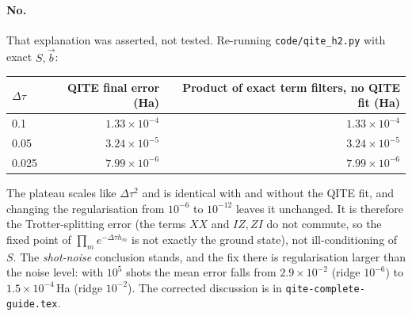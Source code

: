 \documentclass[11pt,a4paper]{article}
\begin{document}
\paragraph{No.} That explanation was asserted, not tested. Re-running \texttt{code/qite\_h2.py} with exact $S,\vec b$:
\begin{center}
\begin{tabular}{@{}lrr@{}}
\toprule
$\Delta\tau$ & QITE final error (Ha) & Product of exact term filters, no QITE fit (Ha)\\\midrule
0.1 & $1.33\times10^{-4}$ & $1.33\times10^{-4}$\\
0.05 & $3.24\times10^{-5}$ & $3.24\times10^{-5}$\\
0.025 & $7.99\times10^{-6}$ & $7.99\times10^{-6}$\\\bottomrule
\end{tabular}
\end{center}
The plateau scales like $\Delta\tau^2$ and is identical with and without the QITE fit, and changing the
regularisation from $10^{-6}$ to $10^{-12}$ leaves it unchanged. It is therefore the \alert{Trotter-splitting error}
(the terms $XX$ and $IZ,ZI$ do not commute, so the fixed point of $\prod_m e^{-\Delta\tau h_m}$ is not exactly
the ground state), not ill-conditioning of $S$. The \emph{shot-noise} conclusion stands, and the
fix there is regularisation larger than the noise level: with $10^5$ shots the mean error falls from
$2.9\times10^{-2}$ (ridge $10^{-6}$) to $1.5\times10^{-4}$\,Ha (ridge $10^{-2}$). The corrected discussion
is in \texttt{qite-complete-guide.tex}.
\end{document}
